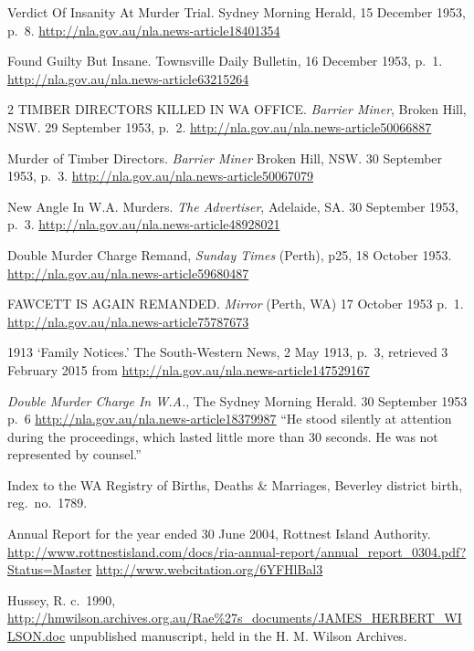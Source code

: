 \begin{thebibliography}{999}
	Verdict Of Insanity At Murder Trial. Sydney Morning Herald, 15 December 1953, p.\ 8.
	\url{http://nla.gov.au/nla.news-article18401354}

	Found Guilty But Insane. Townsville Daily Bulletin, 16 December 1953, p.\ 1.
	\url{http://nla.gov.au/nla.news-article63215264}

	 2 TIMBER DIRECTORS KILLED IN WA OFFICE. \emph{Barrier Miner}, Broken Hill, NSW. 29 September 1953, p.\ 2.
	 \url{http://nla.gov.au/nla.news-article50066887}

	Murder of Timber Directors. \emph{Barrier Miner} Broken Hill, NSW. 30 September 1953, p.\ 3.
	\url{http://nla.gov.au/nla.news-article50067079}

	New Angle In W.A. Murders. \emph{The Advertiser}, Adelaide, SA. 30 September 1953, p.\ 3.
	\url{http://nla.gov.au/nla.news-article48928021}

	Double Murder Charge Remand, \emph{Sunday Times} (Perth), p25, 18 October 1953.
	\url{http://nla.gov.au/nla.news-article59680487}

	FAWCETT IS AGAIN REMANDED. \emph{Mirror} (Perth, WA) 17 October 1953 p.\ 1.
	\url{http://nla.gov.au/nla.news-article75787673}

	1913 `Family Notices.' The South-Western News, 2 May 1913, p.~3,
	retrieved 3 February 2015 from \url{http://nla.gov.au/nla.news-article147529167}

	\emph{Double Murder Charge In W.A.}, The Sydney Morning Herald. 30 September 1953 p.~6
	\url{http://nla.gov.au/nla.news-article18379987}
	``He stood silently at attention during the proceedings, which lasted little more than 30 seconds.
	He was not represented by counsel.''

	Index to the WA Registry of Births, Deaths \& Marriages, Beverley district birth, reg.~no.~1789.

	Annual Report for the year ended 30 June 2004, Rottnest Island Authority.
	\url{http://www.rottnestisland.com/docs/ria-annual-report/annual_report_0304.pdf?Status=Master}
	\url{http://www.webcitation.org/6YFHlBal3}

	Hussey, R. c.~1990, \url{http://hmwilson.archives.org.au/Rae\%27s_documents/JAMES_HERBERT_WILSON.doc}
	unpublished manuscript, held in the  H. M. Wilson Archives.


\end{thebibliography}
